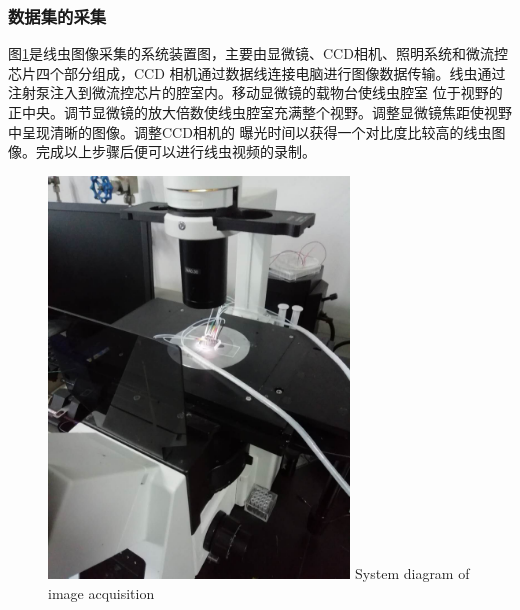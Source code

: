 \subsubsection{数据集的采集}
	图\ref{fig:chap5:camera}是线虫图像采集的系统装置图，主要由显微镜、CCD相机、照明系统和微流控芯片四个部分组成，CCD
	相机通过数据线连接电脑进行图像数据传输。线虫通过注射泵注入到微流控芯片的腔室内。移动显微镜的载物台使线虫腔室
	位于视野的正中央。调节显微镜的放大倍数使线虫腔室充满整个视野。调整显微镜焦距使视野中呈现清晰的图像。调整CCD相机的
	曝光时间以获得一个对比度比较高的线虫图像。完成以上步骤后便可以进行线虫视频的录制。
	\begin{figure}[thb]
	  \centering
	  \includegraphics[width=8cm]{figure/chap5/camera.jpg}
		{System diagram of image acquisition}
	  \label{fig:chap5:camera}
	\end{figure}
